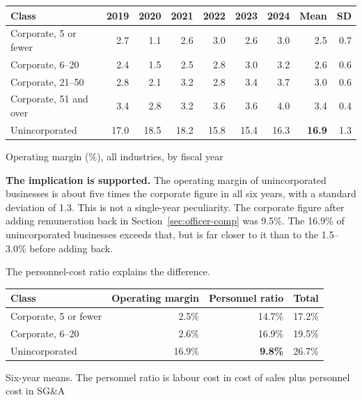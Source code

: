 \begin{center}
\begin{tabular}{@{}lrrrrrrrr@{}}
\toprule
Class & 2019 & 2020 & 2021 & 2022 & 2023 & 2024 & Mean & SD \\
\midrule
Corporate, 5 or fewer & 2.7 & 1.1 & 2.6 & 3.0 & 2.6 & 3.0 & 2.5 & 0.7 \\
Corporate, 6--20 & 2.4 & 1.5 & 2.5 & 2.8 & 3.0 & 3.2 & 2.6 & 0.6 \\
Corporate, 21--50 & 2.8 & 2.1 & 3.2 & 2.8 & 3.4 & 3.7 & 3.0 & 0.6 \\
Corporate, 51 and over & 3.4 & 2.8 & 3.2 & 3.6 & 3.6 & 4.0 & 3.4 & 0.4 \\
Unincorporated & 17.0 & 18.5 & 18.2 & 15.8 & 15.4 & 16.3 & \textbf{16.9} & 1.3 \\
\bottomrule
\end{tabular}
\label{tab:individual-vs-corp-margin}
\end{center}
\begin{center}\footnotesize Operating margin (\%), all industries, by fiscal year\end{center}

\textbf{The implication is supported.} The operating margin of unincorporated businesses is
about five times the corporate figure in all six years, with a standard deviation of 1.3.
This is not a single-year peculiarity. The corporate figure after adding remuneration back in
Section~\ref{sec:officer-comp} was 9.5\%. The 16.9\% of unincorporated businesses exceeds
that, but is far closer to it than to the 1.5--3.0\% before adding back.

The personnel-cost ratio explains the difference.

\begin{center}
\begin{tabular}{@{}lrrr@{}}
\toprule
Class & Operating margin & Personnel ratio & Total \\
\midrule
Corporate, 5 or fewer & 2.5\% & 14.7\% & 17.2\% \\
Corporate, 6--20 & 2.6\% & 16.9\% & 19.5\% \\
Unincorporated & 16.9\% & \textbf{9.8\%} & 26.7\% \\
\bottomrule
\end{tabular}
\label{tab:individual-vs-corp-laborcost}
\end{center}
\begin{center}\footnotesize Six-year means. The personnel ratio is labour cost in cost of sales plus personnel cost in SG\&A\end{center}

